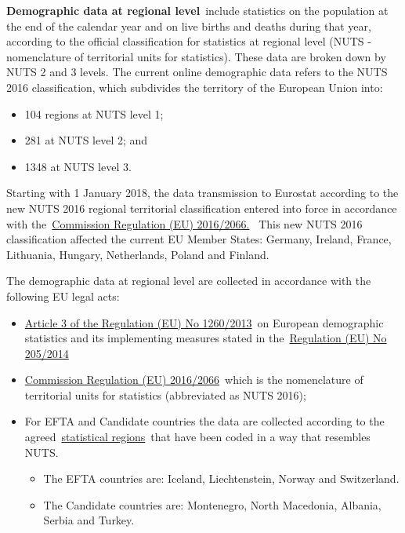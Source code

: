 \documentclass[
  letterpaper,
  DIV=11,
  numbers=noendperiod]{scrartcl}
\begin{document}
\textbf{Demographic data at regional level}~include statistics on the
population at the end of the calendar year and on live births and deaths
during that year, according to the official classification for
statistics at regional level (NUTS - nomenclature of territorial units
for statistics). These data are broken down by NUTS 2 and 3 levels. The
current online demographic data refers to the NUTS 2016 classification,
which subdivides the territory of the European Union into:

\begin{itemize}
\item
  104 regions at NUTS level 1;
\item
  281 at NUTS level 2; and
\item
  1348 at NUTS level 3.
\end{itemize}

Starting with 1 January 2018, the data transmission to Eurostat
according to the new NUTS 2016 regional territorial classification
entered into force in accordance with
the~\href{https://eur-lex.europa.eu/legal-content/EN/TXT/?qid=1485253108026\&uri=CELEX:32016R2066}{Commission
Regulation (EU) 2016/2066.}~ This new NUTS 2016 classification affected
the current EU Member States: Germany, Ireland, France, Lithuania,
Hungary, Netherlands, Poland and Finland.

The demographic data at regional level are collected in accordance with
the following EU legal acts:

\begin{itemize}
\item
  \href{https://eur-lex.europa.eu/legal-content/EN/TXT/?uri=CELEX\%3A32013R1260}{Article
  3 of the Regulation (EU) No 1260/2013}~on European demographic
  statistics and its implementing measures stated in
  the~\href{https://eur-lex.europa.eu/legal-content/EN/ALL/?uri=CELEX\%3A32014R0205}{Regulation
  (EU) No 205/2014}
\item
  \href{https://eur-lex.europa.eu/legal-content/EN/TXT/?uri=celex\%3A32016R2066}{Commission
  Regulation (EU) 2016/2066}~which is the nomenclature of territorial
  units for statistics (abbreviated as NUTS 2016);
\item
  For EFTA and Candidate countries the data are collected according to
  the
  agreed~\href{https://ec.europa.eu/eurostat/web/nuts/statistical-regions-outside-eu}{statistical
  regions}~that have been coded in a way that resembles NUTS.

  \begin{itemize}
  \item
    The EFTA countries are: Iceland, Liechtenstein, Norway and
    Switzerland.
  \item
    The Candidate countries are: Montenegro, North Macedonia, Albania,
    Serbia and Turkey.
  \end{itemize}
\end{itemize}
\end{document}
